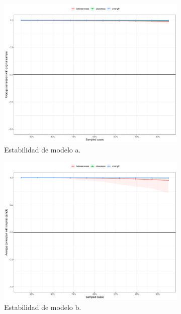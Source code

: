 \documentclass[11pt,spanish]{article}\usepackage[]{graphicx}\usepackage[]{color}
\begin{document}
\begin{figure}[ht]
\centering
\begin{subfigure}{0.49\textwidth}
    \includegraphics[width=\textwidth]{images/estability_pcl5.pdf}
\caption{Estabilidad de modelo a. }
\label{fig:estabilidad_pcl5}
\end{subfigure}
\begin{subfigure}{0.49\textwidth}
    \includegraphics[width=\textwidth]{images/estability_dean.pdf}
\caption{Estabilidad de modelo b.}
\label{fig:estabilidad_dean}
\end{subfigure}
\hfill
\begin{subfigure}{0.6\textwidth}

\end{subfigure}
\end{figure}
\end{document}
